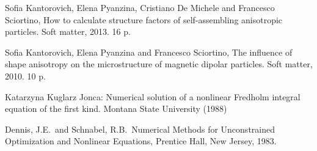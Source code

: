 \documentclass[a4paper,14pt]{extarticle}
\begin{document}
\begin{thebibliography}{99}
        Sofia Kantorovich, Elena Pyanzina, Cristiano De Michele and Francesco Sciortino, How to calculate structure factors of self-assembling anisotropic particles. Soft matter, 2013. 16 p.

        Sofia Kantorovich, Elena Pyanzina and Francesco Sciortino, The influence of shape anisotropy on the microstructure of magnetic dipolar particles. Soft matter, 2010. 10 p.

        Katarzyna Kuglarz Jonca: Numerical solution of a nonlinear Fredholm integral equation of the first kind. Montana State University (1988)

        Dennis, J.E.\ and Schnabel, R.B.\ Numerical Methods for Unconstrained
        Optimization and Nonlinear Equations, Prentice Hall, New Jersey, 1983.
    \end{thebibliography}
    \endgroup
\end{document}
